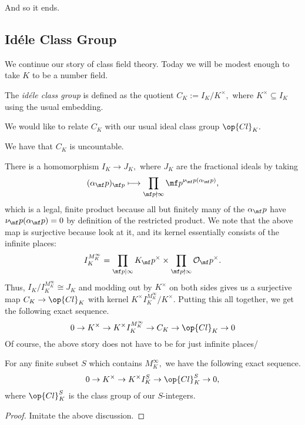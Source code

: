 \documentclass[../notes.tex]{subfiles}
\begin{document}
















And so it ends.

\subsection{Id\'ele Class Group}
We continue our story of class field theory. Today we will be modest enough to take $K$ to be a number field.
\begin{definition}
	The \textit{id\'ele class group} is defined as the quotient $C_K:=I_K/K^\times,$ where $K^\times\subseteq I_K$ using the usual embedding.
\end{definition}
We would like to relate $C_K$ with our usual ideal class group $\op{Cl}_K.$
\begin{remark}
	We have that $C_K$ is uncountable.
\end{remark}
There is a homomorphism $I_K\to J_K,$ where $J_K$ are the fractional ideals by taking
\[(\alpha_\mf p)_{\mf p}\longmapsto\prod_{\mf p\nmid\infty}\mf p^{\nu_\mf p(\alpha_\mf p)},\]
which is a legal, finite product because all but finitely many of the $\alpha_\mf p$ have $\nu_\mf p(\alpha_\mf p)=0$ by definition of the restricted product. We note that the above map is surjective because look at it, and its kernel essentially consists of the infinite places:
\[I_K^{M_K^\infty}=\prod_{\mf p\mid\infty}K_\mf p^\times\times\prod_{\mf p\nmid\infty}\mathcal O_\mf p^\times.\]
Thus, $I_K/I_K^{M_K^\infty}\cong J_K$ and modding out by $K^\times$ on both sides gives us a surjective map $C_K\to\op{Cl}_K$ with kernel $K^\times I_K^{M_K^\infty}/K^\times.$ Putting this all together, we get the following exact sequence.
\[0\to K^\times\to K^\times I_K^{M_K^\infty}\to C_K\to\op{Cl}_K\to0\]
Of course, the above story does not have to be for just infinite places/
\begin{proposition}
	For any finite subset $S$ which contains $M_K^\infty,$ we have the following exact sequence.
	\[0\to K^\times\to K^\times I_K^S\to\op{Cl}_K^S\to0,\]
	where $\op{Cl}_K^S$ is the class group of our $S$-integers.
\end{proposition}
\begin{proof}
	Imitate the above discussion.
\end{proof}
\end{document}
